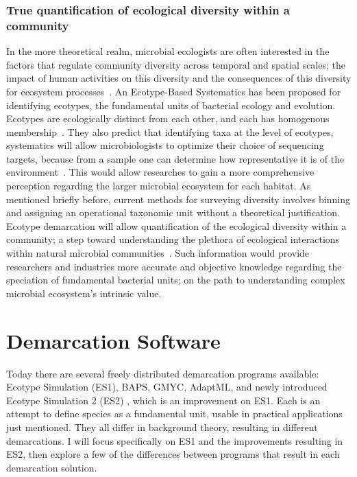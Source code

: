 \subsubsection*{True quantification of ecological diversity within a community}
In the more theoretical realm, microbial ecologists are often interested in the factors that regulate community diversity across temporal and spatial scales; the impact of human activities on this diversity and the consequences of this diversity for ecosystem processes~\cite{bohannan2003new}.
An Ecotype-Based Systematics has been proposed for identifying ecotypes, the fundamental units of bacterial ecology and evolution.
Ecotypes are ecologically distinct from each other, and each has homogenous membership~\cite{cohan2007systematics}.
They also predict that identifying taxa at the level of ecotypes, systematics will allow microbiologists to optimize their choice of sequencing targets, because from a sample one can determine how representative it is of the environment~\cite{bohannan2003new}.
This would allow researches to gain a more comprehensive perception regarding the larger microbial ecosystem for each habitat.
As mentioned briefly before, current methods for surveying diversity involves binning and assigning an operational taxonomic unit without a theoretical justification.
Ecotype demarcation will allow quantification of the ecological diversity within a community; a step toward understanding the plethora of ecological interactions within natural microbial communities~\cite{cohan2007systematics}.
Such information would provide researchers and industries more accurate and objective knowledge regarding the speciation of fundamental bacterial units; on the path to understanding complex microbial ecosystem's intrinsic value.

\section{Demarcation Software}
Today there are several freely distributed demarcation programs available: Ecotype Simulation (ES1), BAPS, GMYC, AdaptML, and newly introduced Ecotype Simulation 2 (ES2) , which is an improvement on ES1.
Each is an attempt to define species as a fundamental unit, usable in practical applications just mentioned.
They all differ in background theory, resulting in different demarcations.
I will focus specifically on ES1 and the improvements resulting in ES2, then explore a few of the differences between programs that result in each demarcation solution.


